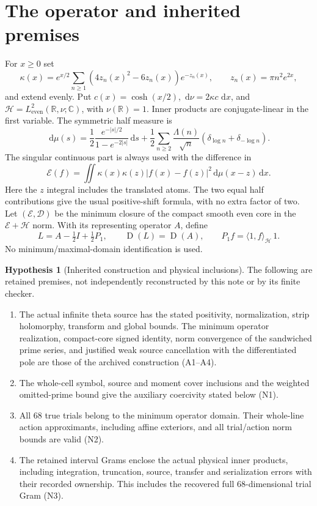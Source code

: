 \documentclass[11pt,a4paper]{article}
\newcommand{\R}{\mathbb R}
\newcommand{\C}{\mathbb C}
\newcommand{\HH}{\mathcal H}
\newcommand{\DD}{\mathcal D}
\newcommand{\EE}{\mathcal E}
\newcommand{\Dom}{\operatorname{D}}
\newcommand{\ip}[2]{\langle #1,#2\rangle}
\newcommand{\dd}{\,\mathrm d}
\theoremstyle{definition}
\newtheorem{hypothesis}[theorem]{Hypothesis}
\theoremstyle{remark}
\numberwithin{equation}{section}
\begin{document}
\section{The operator and inherited premises}

For $x\ge0$ set
\begin{equation}
 \kappa(x)=e^{x/2}\sum_{n\ge1}(4z_n(x)^2-6z_n(x))e^{-z_n(x)},
 \qquad z_n(x)=\pi n^2e^{2x},
\end{equation}
and extend evenly. Put $c(x)=\cosh(x/2)$,
$\dd\nu=2\kappa c\,\dd x$, and
$\HH=L^2_{\mathrm{even}}(\R,\nu;\C)$, with $\nu(\R)=1$.
Inner products are conjugate-linear in the first variable.
The symmetric half measure is
\begin{equation}
 \dd\mu(s)=\frac12\frac{e^{-|s|/2}}{1-e^{-2|s|}}\dd s
 +\frac12\sum_{n\ge2}\frac{\Lambda(n)}{\sqrt n}
       (\delta_{\log n}+\delta_{-\log n}).
\end{equation}
The singular continuous part is always used with the difference in
\begin{equation}
 \EE(f)=\iint\kappa(x)\kappa(z)|f(x)-f(z)|^2\dd\mu(x-z)\dd x.
\end{equation}
Here the $z$ integral includes the translated atoms. The two equal half
contributions give the usual positive-shift formula, with no extra factor
of two. Let $(\EE,\DD)$ be the minimum closure of the compact smooth even
core in the $\EE+\HH$ norm. With its representing operator $A$, define
\begin{equation}
 L=A-\tfrac12I+\tfrac12P_1,\qquad \Dom(L)=\Dom(A),
 \qquad P_1f=\ip1f_{\HH}\,1.
\end{equation}
No minimum/maximal-domain identification is used.

\begin{hypothesis}[Inherited construction and physical inclusions]
The following are retained premises, not independently reconstructed by
this note or by its finite checker.
\begin{enumerate}
\item The actual infinite theta source has the stated positivity,
normalization, strip holomorphy, transform and global bounds. The minimum
operator realization, compact-core signed identity, norm convergence of
the sandwiched prime series, and justified weak source cancellation with
the differentiated pole are those of the archived construction
(A1--A4).
\item The whole-cell symbol, source and moment cover inclusions and the
weighted omitted-prime bound give the auxiliary coercivity stated below
(N1).
\item All 68 true trials belong to the minimum operator domain. Their
whole-line action approximants, including affine exteriors, and all
trial/action norm bounds are valid (N2).
\item The retained interval Grams enclose the actual physical inner
products, including integration, truncation, source, transfer and
serialization errors with their recorded ownership. This includes the
recovered full 68-dimensional trial Gram (N3).
\end{enumerate}
\end{hypothesis}
\end{document}
